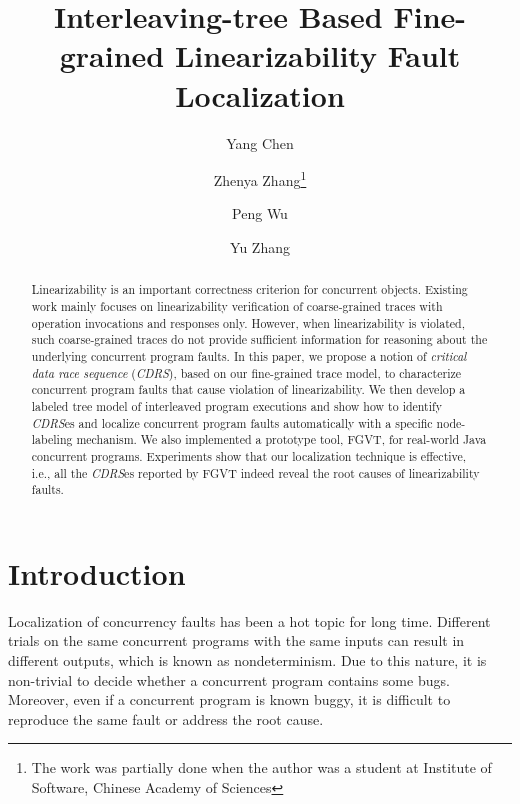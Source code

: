 \documentclass[runningheads]{llncs}
\begin{document}
%
\title{Interleaving-tree Based Fine-grained Linearizability Fault Localization}
%
%
\author{Yang Chen \and
Zhenya Zhang\thanks{The work was partially done when the author was a student at Institute of Software, Chinese Academy of Sciences} \and
Peng Wu\and
Yu Zhang}
%
%
%
\maketitle              %
%
\begin{abstract}
Linearizability is an important correctness criterion for concurrent objects. Existing work mainly focuses on linearizability verification of coarse-grained traces with operation invocations and responses only. However, when linearizability is violated, such coarse-grained traces do not provide sufficient information for reasoning about the underlying concurrent program faults. In this paper, we propose a notion of \textit{critical data race sequence} (\textit{CDRS}), based on our fine-grained trace model, to characterize concurrent program faults that cause violation of linearizability. We then develop a labeled tree model of interleaved program executions and show how to identify \textit{CDRS}es and localize concurrent program faults automatically with a specific node-labeling mechanism. We also implemented a prototype tool, FGVT, for real-world Java concurrent programs. Experiments show that our localization technique is effective, i.e., all the \textit{CDRS}es reported by FGVT indeed reveal the root causes of linearizability faults.

\end{abstract}
%
%
%
%
%
\section{Introduction}\label{sec:introduction}
Localization of concurrency faults has been a hot topic for long time.
Different trials on the same concurrent programs with the same inputs can result in different outputs,
which is known as nondeterminism. Due to this nature, 
it is non-trivial to decide whether a concurrent program contains some bugs.
Moreover, even if a concurrent program is known buggy, 
it is difficult to reproduce the same fault or address the root cause.
\end{document}
